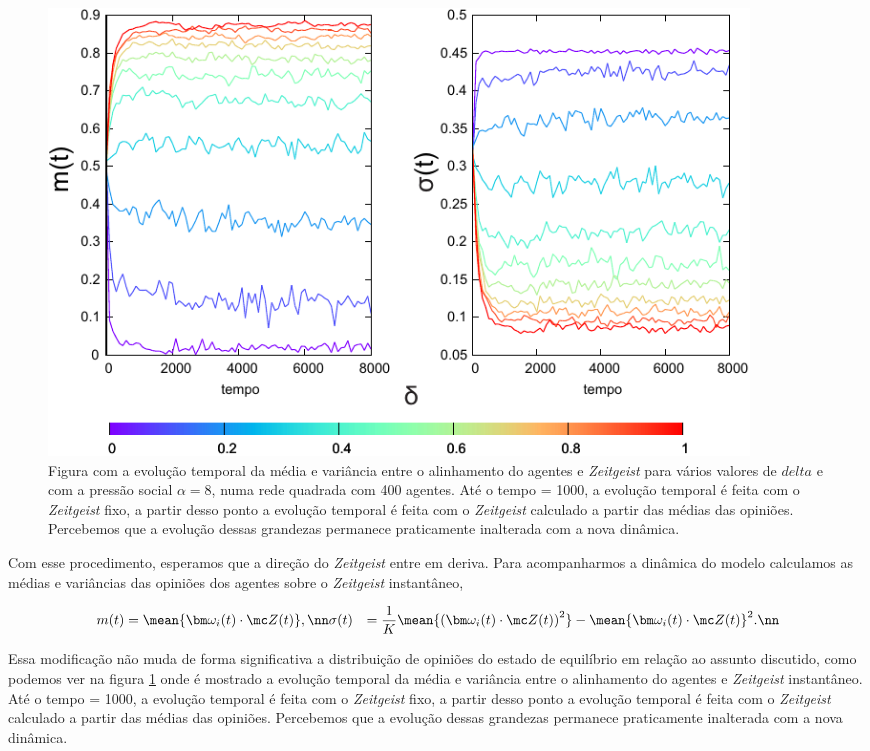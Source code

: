 \begin{figure}
    \centering
\includegraphics[width=0.9\textwidth]{Figures/evolveTermo}
\caption{
        Figura com a evolução temporal da média e variância entre o
    alinhamento do agentes e \textit{Zeitgeist} para vários valores de
    $delta$ e com a pressão social $\alpha = 8$, numa rede quadrada com
    400 agentes. Até o tempo = 1000, a evolução temporal é feita com
    o \textit{Zeitgeist} fixo, a partir desso ponto a evolução temporal
    é feita com o \textit{Zeitgeist} calculado a partir das médias das
    opiniões. Percebemos que a evolução dessas grandezas permanece
    praticamente inalterada com a nova dinâmica.
}
\label{fig:evolveTermo}
\end{figure}

Com esse procedimento, esperamos que a direção do \textit{Zeitgeist} entre em
deriva. Para acompanharmos a dinâmica do modelo calculamos as médias e
variâncias das opiniões dos agentes sobre o \textit{Zeitgeist} instantâneo,

\begin{align}
m(t) &= \mean{\bm \omega_i(t)\cdot \mc Z(t)}, \nn 
\sigma(t) &= \frac{1}{K}\mean{\left(\bm \omega_i(t)\cdot \mc Z(t)\right)^2}
    - \mean{\bm \omega_i(t)\cdot \mc Z(t)}^2. \nn 
\end{align}

Essa modificação não muda de forma significativa a distribuição
de opiniões do estado de equilíbrio em relação ao assunto discutido,
como podemos ver na figura \ref{fig:evolveTermo} onde é mostrado a
evolução temporal da média e variância entre o alinhamento do agentes e
\textit{Zeitgeist} instantâneo. Até o tempo = 1000, a evolução temporal
é feita com o \textit{Zeitgeist} fixo, a partir desso ponto a evolução
temporal é feita com o \textit{Zeitgeist} calculado a partir das médias das
opiniões. Percebemos que a evolução dessas grandezas permanece praticamente
inalterada com a nova dinâmica.

